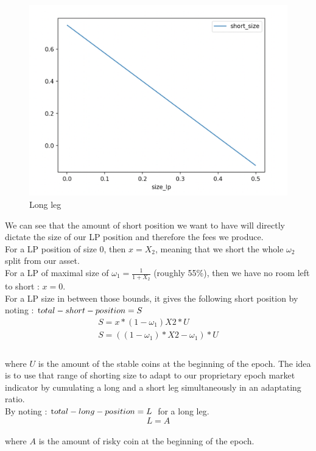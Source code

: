 \documentclass[conference]{IEEEtran}
\begin{document}
\begin{figure}[h!]
    \centering
    \includegraphics[scale=0.3]{Plots/short_size_as_lp_size.png}
    \caption{Long leg}
    \label{fig:conc_liquidity}
\end{figure}
We can see that the amount of short position we want to have will directly dictate the size of our LP position and therefore the fees we produce.\\
For a LP position of size 0, then $x=X_2$, meaning that we short the whole $\omega_2$ split from our asset.\\
For a LP of maximal size of $\omega_1 = \frac{1}{1+X_2}$ (roughly 55\%), then we have no room left to short : $x=0$.\\
For a LP size in between those bounds, it gives the following short position by noting : ${\text total-short-position} = S $\\
\begin{equation}
\begin{array}{ll}
S= x*(1-\omega_1)X2*U \\
S =  \left((1-\omega_1)*X2-\omega_1 \right)*U\\
\end{array}
\end{equation}\\
where $U$ is the amount of the stable coins at the beginning of the epoch.
The idea is to use that range of shorting size to adapt to our proprietary epoch market indicator by cumulating a long and a short leg simultaneously in an adaptating ratio.\\
By noting : ${\text total-long-position} = L $\ for a long leg.
\begin{equation}
L = A
\end{equation}\\where $A$ is the amount of risky coin at the beginning of the epoch.\\
\end{document}

